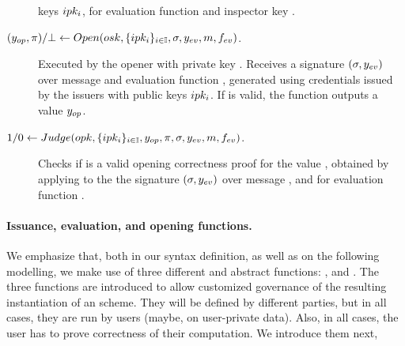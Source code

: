 \begin{description}
  keys $ipk_i$, for evaluation function \feval and inspector key \opk.
\item[$(y_{op},\pi)/\bot \gets Open(osk,\lbrace ipk_i
  \rbrace_{i \in \mathbb{I}},\sigma,y_{ev},m,f_{ev})$.] %
  Executed by the opener with private key \osk. Receives a signature $(\sigma,
  y_{ev})$ over message \msg and evaluation function \feval, generated using
  credentials issued by the issuers with public keys $ipk_i$. If \sig is valid,
  the function outputs a value $y_{op}$.
\item[$1/0 \gets Judge(opk,\lbrace ipk_i \rbrace_{i \in \mathbb{I}},y_{op},
  \pi,\sigma,y_{ev},m,f_{ev})$.] %
  Checks if \iproof is a valid opening correctness proof for the value \yinsp,
  obtained by applying \Open to the the signature $(\sigma,y_{ev})$ over
  message \msg, and for evaluation function \feval. 
\end{description}

\paragraph{Issuance, evaluation, and opening functions.} %
We emphasize that, both in our syntax definition, as well as on the following
modelling, we make use of three different and abstract functions: \fissue,
\feval and \finsp. The three functions are introduced to allow customized
governance of the resulting instantiation of an \UAS scheme. They will be
defined by different parties, but in all cases, they are run by users (maybe,
on user-private data). Also, in all cases, the user has to prove correctness of
their computation. We introduce them next, 

